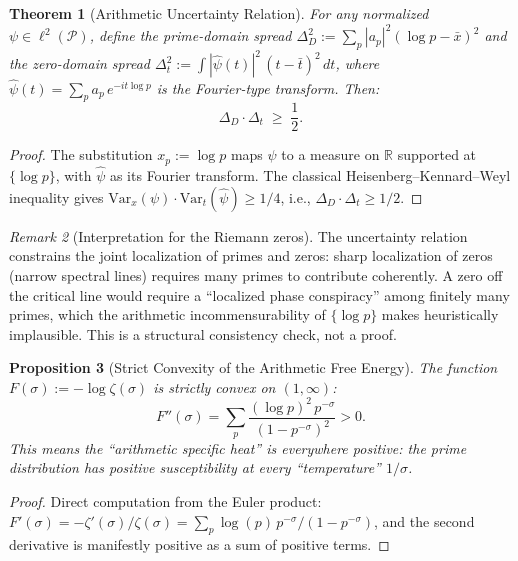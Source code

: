 \documentclass[12pt,a4paper]{article}
\newtheorem{theorem}{Theorem}[section]
\newtheorem{proposition}[theorem]{Proposition}
\theoremstyle{definition}
\theoremstyle{remark}
\newtheorem{remark}[theorem]{Remark}
\begin{document}
\begin{theorem}[Arithmetic Uncertainty Relation]\label{thm:uncertainty}
For any normalized $\psi \in \ell^2(\mathcal{P})$, define the prime-domain spread $\Delta_D^2 := \sum_p |a_p|^2(\log p - \bar{x})^2$ and the zero-domain spread $\Delta_t^2 := \int |\hat\psi(t)|^2\,(t - \bar{t})^2\,dt$, where $\hat\psi(t) = \sum_p a_p\,e^{-it\log p}$ is the Fourier-type transform. Then:
\begin{equation}\label{eq:uncertainty}
\Delta_D \cdot \Delta_t \;\geq\; \frac{1}{2}.
\end{equation}
\end{theorem}
\begin{proof}
The substitution $x_p := \log p$ maps $\psi$ to a measure on $\mathbb{R}$ supported at $\{\log p\}$, with $\hat\psi$ as its Fourier transform. The classical Heisenberg--Kennard--Weyl inequality gives $\mathrm{Var}_x(\psi)\cdot\mathrm{Var}_t(\hat\psi) \geq 1/4$, i.e., $\Delta_D \cdot \Delta_t \geq 1/2$.
\end{proof}

\begin{remark}[Interpretation for the Riemann zeros]
The uncertainty relation constrains the joint localization of primes and zeros: sharp localization of zeros (narrow spectral lines) requires many primes to contribute coherently. A zero off the critical line would require a ``localized phase conspiracy'' among finitely many primes, which the arithmetic incommensurability of $\{\log p\}$ makes heuristically implausible. This is a structural consistency check, not a proof.
\end{remark}

\begin{proposition}[Strict Convexity of the Arithmetic Free Energy]\label{prop:strict-convex}
The function $F(\sigma) := -\log\zeta(\sigma)$ is strictly convex on $(1, \infty)$:
\begin{equation}
F''(\sigma) = \sum_p \frac{(\log p)^2\,p^{-\sigma}}{(1-p^{-\sigma})^2} > 0.
\end{equation}
This means the ``arithmetic specific heat'' is everywhere positive: the prime distribution has positive susceptibility at every ``temperature'' $1/\sigma$.
\end{proposition}
\begin{proof}
Direct computation from the Euler product: $F'(\sigma) = -\zeta'(\sigma)/\zeta(\sigma) = \sum_p \log(p)\,p^{-\sigma}/(1-p^{-\sigma})$, and the second derivative is manifestly positive as a sum of positive terms.
\end{proof}
\end{document}
